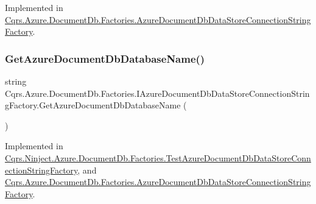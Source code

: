 Implemented in \hyperlink{classCqrs_1_1Azure_1_1DocumentDb_1_1Factories_1_1AzureDocumentDbDataStoreConnectionStringFactory_a0525c318c3930076e08ed83f9829ab2c_a0525c318c3930076e08ed83f9829ab2c}{Cqrs.\+Azure.\+Document\+Db.\+Factories.\+Azure\+Document\+Db\+Data\+Store\+Connection\+String\+Factory}.

\mbox{\label{interfaceCqrs_1_1Azure_1_1DocumentDb_1_1Factories_1_1IAzureDocumentDbDataStoreConnectionStringFactory_aa5e3d0920e86a97aef18f4f215ce4f88_aa5e3d0920e86a97aef18f4f215ce4f88}} 
\subsubsection{\texorpdfstring{Get\+Azure\+Document\+Db\+Database\+Name()}{GetAzureDocumentDbDatabaseName()}}
{\footnotesize\ttfamily string Cqrs.\+Azure.\+Document\+Db.\+Factories.\+I\+Azure\+Document\+Db\+Data\+Store\+Connection\+String\+Factory.\+Get\+Azure\+Document\+Db\+Database\+Name (\begin{DoxyParamCaption}{ }\end{DoxyParamCaption})}



Implemented in \hyperlink{classCqrs_1_1Ninject_1_1Azure_1_1DocumentDb_1_1Factories_1_1TestAzureDocumentDbDataStoreConnectionStringFactory_ab4b864396b790819609d3337dfb3f75d_ab4b864396b790819609d3337dfb3f75d}{Cqrs.\+Ninject.\+Azure.\+Document\+Db.\+Factories.\+Test\+Azure\+Document\+Db\+Data\+Store\+Connection\+String\+Factory}, and \hyperlink{classCqrs_1_1Azure_1_1DocumentDb_1_1Factories_1_1AzureDocumentDbDataStoreConnectionStringFactory_a2a30d6066e2bc9c4af078b1f0a5407ab_a2a30d6066e2bc9c4af078b1f0a5407ab}{Cqrs.\+Azure.\+Document\+Db.\+Factories.\+Azure\+Document\+Db\+Data\+Store\+Connection\+String\+Factory}.

